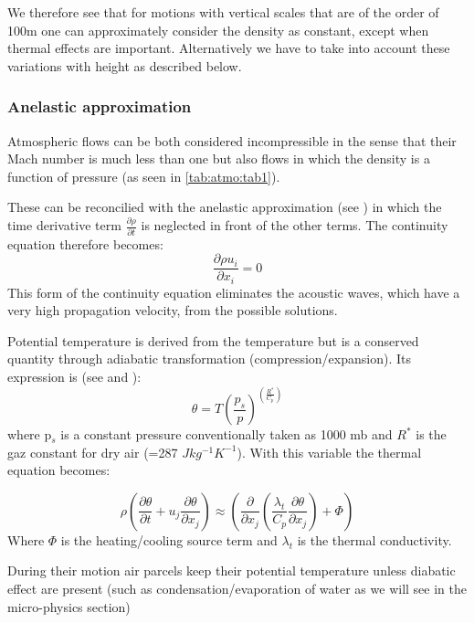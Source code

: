 We therefore see that for motions with vertical scales that are of the order
of 100m one can approximately consider the density as constant, except when
thermal effects are important. Alternatively we have to take into account
these variations with height as described below.

\subsubsection{Anelastic approximation}
Atmospheric flows can be both considered incompressible in the sense that
their Mach number is much less than one but also flows in which the density
is a function of pressure (as seen in \tablename{} \ref{tab:atmo:tab1}).

These can be reconcilied with the anelastic approximation (see \cite{Pielke:1984})
 in which the time derivative term $\frac{\partial \rho }{\partial
t}$ is neglected in front of the other terms. The continuity equation
therefore becomes:
\begin{equation}
\frac{\partial \rho u_{i} }{\partial x_{i} }=0
\end{equation}
This form of the continuity equation eliminates the acoustic waves, which
have a very high propagation velocity, from the possible solutions.

Potential temperature is derived from the temperature but is a conserved
quantity through adiabatic transformation (compression/expansion). Its
expression is (see \cite{Holton:1979} and \cite{Stull:1988}):
\begin{equation}
\label{eq1}
\theta =T\left( {\frac{p_{s}}{p}} \right)^{\left( {\frac{R^{\ast }}{C_{p}}} \right)}
\end{equation}
where p$_{s}$ is a constant pressure conventionally taken as 1000 mb
and $R^{\ast}$ is the gaz constant for dry air (=287 $Jkg^{-1}K^{-1}$).
With this variable the thermal equation becomes:

\begin{equation}
\rho \left( {\frac{\partial \theta }{\partial t}+u_{j} \frac{\partial \theta
}{\partial x_{j} }} \right)\approx\left( {\frac{\partial }{\partial x_{j}
}\left( {\frac{\lambda_{t} }{C_{p} }\frac{\partial \theta}{\partial x_{j} }}
\right)+\Phi } \right)
\end{equation}
Where $\Phi $ is the heating/cooling source term and $\lambda_{t}$ is the thermal conductivity.

During their motion air parcels keep their potential temperature unless
diabatic effect are present (such as condensation/evaporation of water as we
will see in the micro-physics section)

